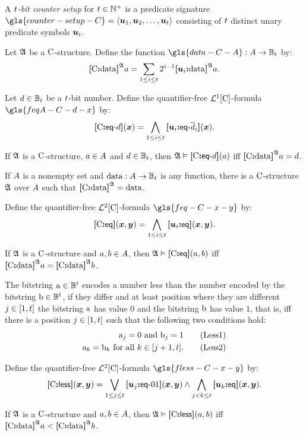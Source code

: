 A \emph{$t$-bit counter setup} for $t \in \mathbb{N}^{+}$ is a predicate
signature $\gls{counter-setup-C} = \seq{\suu1, \suu2, \dots, \suu\tbit}$
consisting of $t$ distinct unary predicate symbols $\bm{u}_{i}$.

\begin{definition}
Let $\mathfrak{A}$ be a ${\mathrm{C}}$-structure. Define the function
$\gls{data-C-A} : \domA \to \tBitnums\tbit$ by:
\[
  {\bm{[}{\mathrm{C}}\mathord{\bm{:}}\mathrm{data}\bm{]}}^{\mathfrak{A}}a = \sum_{1 \leq i \leq t} 2^{i-1} 
  {\bm{[}\bm{u}_{i}\mathord{\bm{:}}\mathrm{data}\bm{]}}^{\mathfrak{A}}a.
\]
\end{definition}
\begin{definition}
Let $d \in \mathbb{B}_{t}$ be a $t$-bit number. Define the
quantifier-free $\mathcal{L}^{1}[{\mathrm{C}}]$-formula $\gls{feqA-C-d-x}$ by:
\[
  {\bm{[}{\mathrm{C}}\mathord{\bm{:}}\mathsf{eq}{\hbox{-}}d\bm{]}}(\bm{x}) = \bigwedge_{1 \leq i \leq t}
  {\bm{[}\bm{u}_{i}\mathord{\bm{:}}\mathsf{eq}{\hbox{-}}\overline{d}_i\bm{]}}(\bm{x}).
\]
\end{definition}
\begin{remark}
If $\mathfrak{A}$ is a ${\mathrm{C}}$-structure, $a \in A$ and $d \in
\mathbb{B}_{t}$, then $\mathfrak{A} \vDash {\bm{[}{\mathrm{C}}\mathord{\bm{:}}\mathsf{eq}{\hbox{-}}d\bm{]}}(a)$ iff ${\bm{[}{\mathrm{C}}\mathord{\bm{:}}\mathrm{data}\bm{]}}^{\mathfrak{A}} a =
d$.

If $A$ is a nonempty set and $\operatorname{data} : A \to \mathbb{B}_{t}$ is any
function, there is a ${\mathrm{C}}$-structure $\mathfrak{A}$ over $A$ such that
${\bm{[}{\mathrm{C}}\mathord{\bm{:}}\mathrm{data}\bm{]}}^{\mathfrak{A}} = \operatorname{data}$.
\end{remark}

\begin{definition}
Define the quantifier-free $\mathcal{L}^{2}[{\mathrm{C}}]$-formula $\gls{feq-C-x-y}$ by:
\[
  {\bm{[}{\mathrm{C}}\mathord{\bm{:}}\mathsf{eq}\bm{]}}(\bm{x},\bm{y}) = \bigwedge_{1 \leq i \leq t} {\bm{[}\bm{u}_{i}\mathord{\bm{:}}\mathsf{eq}\bm{]}}(\bm{x},\bm{y}).
\]
\end{definition}
\begin{remark}
If $\mathfrak{A}$ is a ${\mathrm{C}}$-structure and $a, b \in A$,
then $\mathfrak{A} \vDash {\bm{[}{\mathrm{C}}\mathord{\bm{:}}\mathsf{eq}\bm{]}}(a, b)$ iff ${\bm{[}{\mathrm{C}}\mathord{\bm{:}}\mathrm{data}\bm{]}}^{\mathfrak{A}}a = {\bm{[}{\mathrm{C}}\mathord{\bm{:}}\mathrm{data}\bm{]}}^{\mathfrak{A}}b$.
\end{remark}
The bitstring $\mathrm{a} \in \mathbb{B}^{t}$ encodes a number less than the
number encoded by the bitstring $\mathrm{b} \in \mathbb{B}^{t}$, if they differ
and at least position where they are different $j \in [1,t]$ the bitstring
$\mathrm{a}$ has value $0$ and the bitstring $\mathrm{b}$ has value $1$, that is, iff
there is a position $j \in [1,t]$ such that the following two conditions
hold:
\begin{align}
  \bstra_\jj = 0 \text{ and } \bstrb_\jj = 1 \tag{Less1}\label{Less1} \\
  \bstra_\kk = \bstrb_\kk \text{ for all } \kk \in [\jj+1,\tbit].
  \tag{Less2}\label{Less2}
\end{align}
\begin{definition}
Define the quantifier-free $\mathcal{L}^{2}[{\mathrm{C}}]$-formula $\gls{fless-C-x-y}$ by:
\[
  {\bm{[}{\mathrm{C}}\mathord{\bm{:}}\mathsf{less}\bm{]}}(\bm{x},\bm{y}) = \bigvee_{1 \leq j \leq t} {\bm{[}\bm{u}_{j}\mathord{\bm{:}}\mathsf{eq}{\hbox{-}}01\bm{]}}(\bm{x},\bm{y})
  \land \bigwedge_{j < k \leq t} {\bm{[}\bm{u}_{k}\mathord{\bm{:}}\mathsf{eq}\bm{]}}(\bm{x},\bm{y}).
\]
\end{definition}
\begin{remark}
If $\mathfrak{A}$ is a ${\mathrm{C}}$-structure and $a, b \in A$,
then $\mathfrak{A} \vDash {\bm{[}{\mathrm{C}}\mathord{\bm{:}}\mathsf{less}\bm{]}}(a, b)$ iff
${\bm{[}{\mathrm{C}}\mathord{\bm{:}}\mathrm{data}\bm{]}}^{\mathfrak{A}}a < {\bm{[}{\mathrm{C}}\mathord{\bm{:}}\mathrm{data}\bm{]}}^{\mathfrak{A}}b$.
\end{remark}

